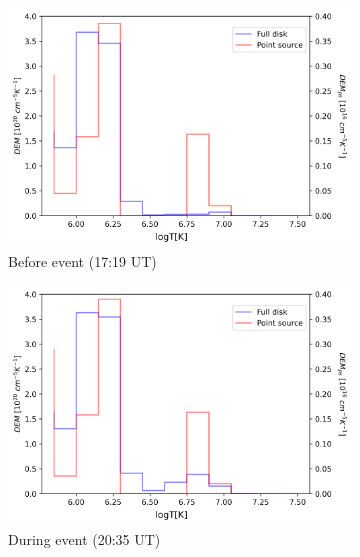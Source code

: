\begin{figure}[h!]

    \begin{subfigure}[b]{0.3\textwidth}
        \centering
        \includegraphics[width=\textwidth]{images/dem_profile_before_event_2012_aug_31.png}
        \caption{Before event (17:19 UT)}
    \end{subfigure}
    \hfill
    \begin{subfigure}[b]{0.3\textwidth}
        \centering
        \includegraphics[width=\textwidth]{images/dem_profile_during_event_2012_aug_31.png}
        \caption{During event (20:35 UT)}
        \label{fig:dem_pro_aug_31_2012_b}
    \end{subfigure}
    \hfill
    \begin{subfigure}[b]{0.3\textwidth}
        \centering

\end{subfigure}
\end{figure}

